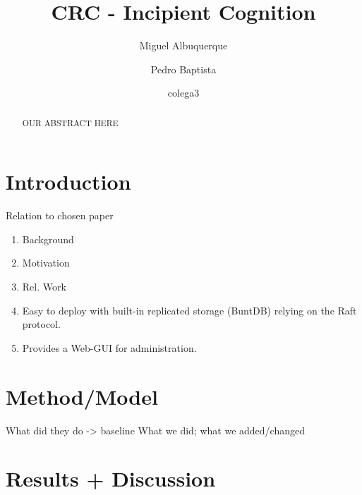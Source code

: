 \documentclass[runningheads]{llncs}
\begin{document}
%
\title{CRC - Incipient Cognition}


%
%
\author{Miguel Albuquerque \and
Pedro Baptista \and colega3}


%
\maketitle              %
%
\begin{abstract}
OUR ABSTRACT HERE
\end{abstract}


%
%
%


\section{Introduction}

Relation to chosen paper
\begin{enumerate}
    \item Background
    \item Motivation
    \item Rel. Work
    \item Easy to deploy with built-in replicated storage (BuntDB) relying on the Raft protocol.
    \item Provides a Web-GUI for administration.
\end{enumerate}


\section{Method/Model}
What did they do -> baseline
What we did; what we added/changed


\section{Results + Discussion}
\end{document}
